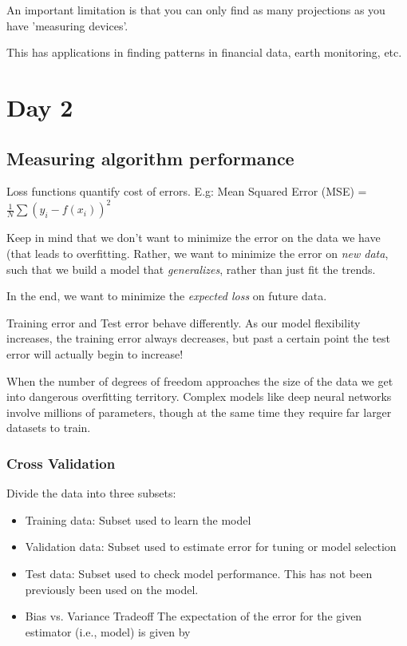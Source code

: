 \documentclass[11pt]{article}
\begin{document}
\begin{itemize}
\begin{itemize}
An important limitation is that you can only find as many projections as you have 'measuring devices'.

This has applications in finding patterns in financial data, earth monitoring, etc.
\end{itemize}

\section*{Day 2}
\label{sec-3}
\subsection{Measuring algorithm performance}
\label{sec-3-1}
Loss functions quantify cost of errors. E.g: Mean Squared Error (MSE) = $\frac{1}{N}\sum\left(y_i-f(x_i)\right)^2$

Keep in mind that we don't want to minimize the error on the data we have (that leads to overfitting. Rather, we want to minimize the error on \emph{new data}, such that we build a model that \emph{generalizes}, rather than just fit the trends.

In the end, we want to minimize the \emph{expected loss} on future data.

Training error and Test error behave differently. As our model flexibility increases, the training error always decreases, but past a certain point the test error will actually begin to increase!

When the number of degrees of freedom approaches the size of the data we get into dangerous overfitting territory. Complex models like deep neural networks involve millions of parameters, though at the same time they require far larger datasets to train.
\subsubsection*{Cross Validation}
\label{sec-3-1-1}
Divide the data into three subsets:
\begin{itemize}
\item Training data: Subset used to learn the model
\item Validation data: Subset used to estimate error for tuning or model selection
\item Test data: Subset used to check model performance. This has not been previously been used on the model.
\end{itemize}
\begin{itemize}
\item Bias vs. Variance Tradeoff
\label{sec-3-1-1-1}
The expectation of the error for the given estimator (i.e., model) is given by


\end{itemize}
\end{itemize}
\end{document}
